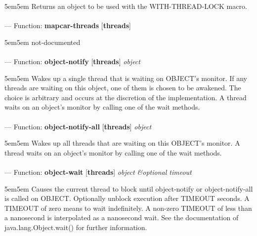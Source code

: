 \begin{adjustwidth}{5em}{5em}
Returns an object to be used with the WITH-THREAD-LOCK macro.
\end{adjustwidth}

\paragraph{}
\label{THREADS:MAPCAR-THREADS}
--- Function: \textbf{mapcar-threads} [\textbf{threads}] \textit{}

\begin{adjustwidth}{5em}{5em}
not-documented
\end{adjustwidth}

\paragraph{}
\label{THREADS:OBJECT-NOTIFY}
--- Function: \textbf{object-notify} [\textbf{threads}] \textit{object}

\begin{adjustwidth}{5em}{5em}
Wakes up a single thread that is waiting on OBJECT's monitor.
If any threads are waiting on this object, one of them is chosen to be awakened. The choice is arbitrary and occurs at the discretion of the implementation. A thread waits on an object's monitor by calling one of the wait methods.
\end{adjustwidth}

\paragraph{}
\label{THREADS:OBJECT-NOTIFY-ALL}
--- Function: \textbf{object-notify-all} [\textbf{threads}] \textit{object}

\begin{adjustwidth}{5em}{5em}
Wakes up all threads that are waiting on this OBJECT's monitor.
A thread waits on an object's monitor by calling one of the wait methods.
\end{adjustwidth}

\paragraph{}
\label{THREADS:OBJECT-WAIT}
--- Function: \textbf{object-wait} [\textbf{threads}] \textit{object \&optional timeout}

\begin{adjustwidth}{5em}{5em}
Causes the current thread to block until object-notify or object-notify-all is called on OBJECT.
Optionally unblock execution after TIMEOUT seconds.  A TIMEOUT of zero
means to wait indefinitely.
A non-zero TIMEOUT of less than a nanosecond is interpolated as a nanosecond wait.
See the documentation of java.lang.Object.wait() for further
information.

\end{adjustwidth}

